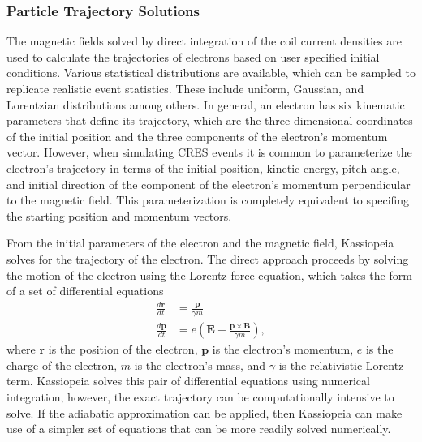 \subsubsection*{Particle Trajectory Solutions}

The magnetic fields solved by direct integration of the coil current densities are used to calculate the trajectories of electrons based on user specified initial conditions. Various statistical distributions are available, which can be sampled to replicate realistic event statistics. These include uniform, Gaussian, and Lorentzian distributions among others. In general, an electron has six kinematic parameters that define its trajectory, which are the three-dimensional coordinates of the initial position and the three components of the electron's momentum vector. However, when simulating CRES events it is common to parameterize the electron's trajectory in terms of the initial position, kinetic energy, pitch angle, and initial direction of the component of the electron's momentum perpendicular to the magnetic field. This parameterization is completely equivalent to specifing the starting position and momentum vectors. 

From the initial parameters of the electron and the magnetic field, Kassiopeia solves for the trajectory of the electron. The direct approach proceeds by solving the motion of the electron using the Lorentz force equation, which takes the form of a set of differential equations 
\begin{align}
    \frac{d\mathbf{r}}{dt}&=\frac{\mathbf{p}}{\gamma m}\\
    \frac{d\mathbf{p}}{dt}&=e(\mathbf{E}+\frac{\mathbf{p}\times\mathbf{B}}{\gamma m}),
\end{align}
where $\mathbf{r}$ is the position of the electron, $\mathbf{p}$ is the electron's momentum, $e$ is the charge of the electron, $m$ is the electron's mass, and $\gamma$ is the relativistic Lorentz term. %
Kassiopeia solves this pair of differential equations using numerical integration, however, the exact trajectory can be computationally intensive to solve. If the adiabatic approximation can be applied, then Kassiopeia can make use of a simpler set of equations that can be more readily solved numerically. 

